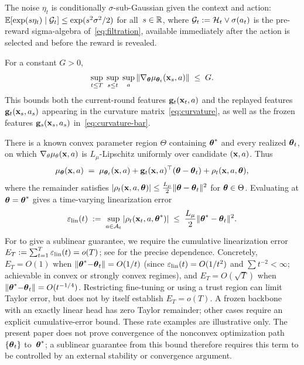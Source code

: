 \begin{assumption}\label{asm:noise}
The noise $\eta_t$ is conditionally $\sigma$-sub-Gaussian given the
context and action:
$\mathbb{E}[\exp(s\eta_t)\mid\mathcal{G}_t]\le\exp(s^2\sigma^2/2)$
for all~$s\in\mathbb{R}$, where
$\mathcal{G}_t := \mathcal{H}_t\vee\sigma(a_t)$ is the pre-reward sigma-algebra
of~\eqref{eq:filtration}, available immediately after the action is
selected and before the reward is revealed.
\end{assumption}

\begin{assumption}\label{asm:bounded}
For a constant $G>0$,
\[
  \sup_{t\le T}\;\sup_{s\le t}\;\sup_{a}
  \|\nabla_{\boldsymbol{\theta}}\mu_{\boldsymbol{\theta}_t}(\mathbf{x}_s,a)\| \;\le\; G.
\]
This bounds both the current-round features
$\mathbf{g}_t(\mathbf{x}_t,a)$ and the replayed features
$\mathbf{g}_t(\mathbf{x}_s,a_s)$ appearing in the curvature
matrix~\eqref{eq:curvature}, as well as the frozen features
$\mathbf{g}_s(\mathbf{x}_s,a_s)$ in~\eqref{eq:curvature-bar}.
\end{assumption}

\begin{assumption}\label{asm:linear}
There is a known convex parameter region $\Theta$ containing
$\boldsymbol{\theta}^*$ and every realized $\boldsymbol{\theta}_t$, on which
$\nabla_\theta\mu_\theta(\mathbf{x},a)$ is $L_\mu$-Lipschitz uniformly over
candidate $(\mathbf{x},a)$.  Thus
\begin{equation}\label{eq:linearization}
  \mu_{\boldsymbol{\theta}}(\mathbf{x},a) \;=\;
    \mu_{\boldsymbol{\theta}_t}(\mathbf{x},a)
    + \mathbf{g}_t(\mathbf{x},a)^\top(\boldsymbol{\theta} - \boldsymbol{\theta}_t)
    + \rho_t(\mathbf{x},a,\boldsymbol{\theta}),
\end{equation}
where the remainder satisfies
$|\rho_t(\mathbf{x},a,\boldsymbol{\theta})| \le \tfrac{L_\mu}{2}\|\boldsymbol{\theta}-\boldsymbol{\theta}_t\|^2$
for $\boldsymbol{\theta}\in\Theta$.
Evaluating at $\boldsymbol{\theta}=\boldsymbol{\theta}^*$ gives a time-varying linearization error
\begin{equation}\label{eq:epslin-t}
  \varepsilon_{\mathrm{lin}}(t)
  \;:=\;
  \sup_{a\in\mathcal{A}_t}|\rho_t(\mathbf{x}_t,a,\boldsymbol{\theta}^*)|
  \;\le\;
  \frac{L_\mu}{2}\|\boldsymbol{\theta}^* - \boldsymbol{\theta}_t\|^2.
\end{equation}
For  to give a sublinear guarantee, we require the cumulative linearization
error $E_T:=\sum_{t=1}^{T}\varepsilon_{\mathrm{lin}}(t) = o(T)$; see 
for the precise dependence.  Concretely, $E_T=O(1)$ when
$\|\boldsymbol{\theta}^*{-}\boldsymbol{\theta}_t\|=O(1/t)$ (since
$\varepsilon_{\mathrm{lin}}(t)=O(1/t^2)$ and $\sum t^{-2}<\infty$;
achievable in convex or strongly convex regimes),
and $E_T=O(\sqrt{T})$ when
$\|\boldsymbol{\theta}^*{-}\boldsymbol{\theta}_t\|=O(t^{-1/4})$.
Restricting fine-tuning or using a trust region can limit Taylor error,
but does not by itself establish $E_T=o(T)$.  A frozen backbone with an
exactly linear head has zero Taylor remainder; other cases require an
explicit cumulative-error bound.
These rate examples are illustrative only.  The present paper does not
prove convergence of the nonconvex optimization path
$\{\boldsymbol{\theta}_t\}$ to~$\boldsymbol{\theta}^*$; a sublinear guarantee from this bound therefore
requires this term to be controlled by an external stability or convergence
argument.
\end{assumption}

